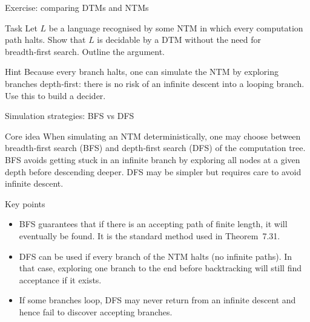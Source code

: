\begin{frame}[t]{Exercise: comparing DTMs and NTMs}
  \begin{tblock}{Task}
    Let $L$ be a language recognised by some NTM in which every
    computation path halts.  Show that $L$ is decidable by a DTM
    without the need for breadth‑first search.  Outline the argument.
  \end{tblock}
  \begin{talert}{Hint}
    Because every branch halts, one can simulate the NTM by exploring
    branches depth‑first: there is no risk of an infinite descent into
    a looping branch.  Use this to build a decider.
  \end{talert}
  \label{fr:7.7-14}
\end{frame}

\begin{frame}[t]{Simulation strategies: BFS vs DFS}
  \begin{tblock}{Core idea}
    When simulating an NTM deterministically, one may choose between
    breadth‑first search (BFS) and depth‑first search (DFS) of the
    computation tree.  BFS avoids getting stuck in an infinite branch
    by exploring all nodes at a given depth before descending deeper.
    DFS may be simpler but requires care to avoid infinite descent.
  \end{tblock}
  \begin{tblock}{Key points}
    \begin{itemize}
      \item BFS guarantees that if there is an accepting path of
        finite length, it will eventually be found.  It is the
        standard method used in Theorem 7.31.
      \item DFS can be used if every branch of the NTM halts (no
        infinite paths).  In that case, exploring one branch to the end
        before backtracking will still find acceptance if it exists.
      \item If some branches loop, DFS may never return from an
        infinite descent and hence fail to discover accepting branches.
    \end{itemize}
  \end{tblock}
  \label{fr:7.7-16}
\end{frame}

